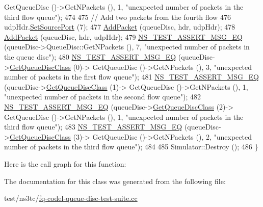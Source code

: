 \begin{DoxyCode}
      GetQueueDisc ()->GetNPackets (), 1, \textcolor{stringliteral}{"unexpected number of packets in the third flow queue"});
474 
475   \textcolor{comment}{// Add two packets from the fourth flow}
476   udpHdr.\hyperlink{classns3_1_1UdpHeader_ae10a7c9c6cbd645745bebc2a84a78831}{SetSourcePort} (7);
477   \hyperlink{classFqCoDelQueueDiscUDPFlowsSeparation_a632c0fbc4d46616fedb0b9ab9f75e769}{AddPacket} (queueDisc, hdr, udpHdr);
478   \hyperlink{classFqCoDelQueueDiscUDPFlowsSeparation_a632c0fbc4d46616fedb0b9ab9f75e769}{AddPacket} (queueDisc, hdr, udpHdr);
479   \hyperlink{group__testing_ga2a9d78cffb3db8e867c35fff0b698cf5}{NS\_TEST\_ASSERT\_MSG\_EQ} (queueDisc->QueueDisc::GetNPackets (), 7, \textcolor{stringliteral}{"unexpected number
       of packets in the queue disc"});
480   \hyperlink{group__testing_ga2a9d78cffb3db8e867c35fff0b698cf5}{NS\_TEST\_ASSERT\_MSG\_EQ} (queueDisc->\hyperlink{classns3_1_1QueueDisc_a584d228f7bff3f754d32793a38134556}{GetQueueDiscClass} (0)->
      GetQueueDisc ()->GetNPackets (), 3, \textcolor{stringliteral}{"unexpected number of packets in the first flow queue"});
481   \hyperlink{group__testing_ga2a9d78cffb3db8e867c35fff0b698cf5}{NS\_TEST\_ASSERT\_MSG\_EQ} (queueDisc->\hyperlink{classns3_1_1QueueDisc_a584d228f7bff3f754d32793a38134556}{GetQueueDiscClass} (1)->
      GetQueueDisc ()->GetNPackets (), 1, \textcolor{stringliteral}{"unexpected number of packets in the second flow queue"});
482   \hyperlink{group__testing_ga2a9d78cffb3db8e867c35fff0b698cf5}{NS\_TEST\_ASSERT\_MSG\_EQ} (queueDisc->\hyperlink{classns3_1_1QueueDisc_a584d228f7bff3f754d32793a38134556}{GetQueueDiscClass} (2)->
      GetQueueDisc ()->GetNPackets (), 1, \textcolor{stringliteral}{"unexpected number of packets in the third flow queue"});
483   \hyperlink{group__testing_ga2a9d78cffb3db8e867c35fff0b698cf5}{NS\_TEST\_ASSERT\_MSG\_EQ} (queueDisc->\hyperlink{classns3_1_1QueueDisc_a584d228f7bff3f754d32793a38134556}{GetQueueDiscClass} (3)->
      GetQueueDisc ()->GetNPackets (), 2, \textcolor{stringliteral}{"unexpected number of packets in the third flow queue"});
484 
485   Simulator::Destroy ();
486 \}
\end{DoxyCode}


Here is the call graph for this function\+:




The documentation for this class was generated from the following file\+:\begin{DoxyCompactItemize}
\item 
test/ns3tc/\hyperlink{fq-codel-queue-disc-test-suite_8cc}{fq-\/codel-\/queue-\/disc-\/test-\/suite.\+cc}\end{DoxyCompactItemize}
